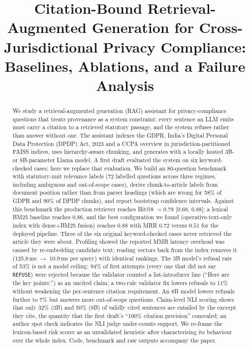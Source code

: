 \documentclass[conference]{IEEEtran}
\newcommand{\ci}[2]{[#1, #2]}
\begin{document}
\title{Citation-Bound Retrieval-Augmented Generation for Cross-Jurisdictional Privacy Compliance:\\ Baselines, Ablations, and a Failure Analysis}

\author{%
}

\maketitle

\begin{abstract}
We study a retrieval-augmented generation (RAG) assistant for privacy-compliance questions that treats provenance as a system constraint: every sentence an LLM emits must carry a citation to a retrieved statutory passage, and the system refuses rather than answer without one. The assistant indexes the GDPR, India's Digital Personal Data Protection (DPDP) Act, 2023 and a CCPA overview in jurisdiction-partitioned FAISS indices, uses hierarchy-aware chunking, and generates with a locally hosted 3B- or 8B-parameter Llama model. A first draft evaluated the system on six keyword-checked cases; here we replace that evaluation. We build an 80-question benchmark with statutory-unit relevance labels (72 labelled questions across three regimes, including ambiguous and out-of-scope cases), derive chunk-to-article labels from document position rather than from parser headings (which are wrong for 58\% of GDPR and 90\% of DPDP chunks), and report bootstrap confidence intervals. Against this benchmark the production retriever reaches Hit@8 $=0.78$ \ci{0.68}{0.88}; a lexical BM25 baseline reaches $0.86$, and the best configuration we found (operative-text-only index with dense+BM25 fusion) reaches $0.88$ with MRR $0.72$ versus $0.51$ for the deployed pipeline. Three of the six original keyword-checked cases never retrieved the article they were about. Profiling showed the reported MMR latency overhead was caused by re-embedding candidate text; reading vectors back from the index removes it (125.8\,ms $\to$ 10.9\,ms per query) with identical rankings. The 3B model's refusal rate of 53\% is not a model ceiling: 94\% of first attempts (every one that did not say \texttt{REFUSE}) were rejected because the validator counted a list-introducer line (``Here are the key points:'') as an uncited claim; a two-rule validator fix lowers refusals to 11\% without weakening the per-sentence citation requirement. An 8B model lowers refusals further to 7\% but answers more out-of-scope questions. Claim-level NLI scoring shows that only 32\% (3B) and 50\% (8B) of validly cited sentences are entailed by the excerpt they cite, the quantity that the first draft's ``100\% citation precision'' concealed; an author spot check indicates the NLI judge under-counts support. We re-frame the lexicon-based risk scorer as an unvalidated heuristic after characterising its behaviour over the whole index. Code, benchmark and raw outputs accompany the paper.
\end{abstract}
\end{document}
